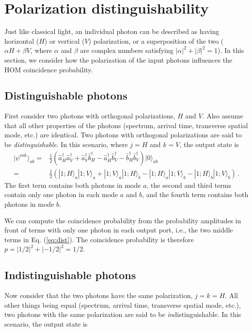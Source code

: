\documentclass[12pt]{article}
\newcommand{\ket}[2] {| #1 \rangle_{#2}}
\newcommand{\dg}{^{\dagger}}
\begin{document}
\section{Polarization distinguishability}\label{sec:pol}

Just like classical light, an individual photon can be described as having horizontal ($H$) or vertical ($V$) polarization, or a superposition of the two ($\alpha H+\beta V$, where $\alpha$ and $\beta$ are complex numbers satisfying $|\alpha|^2+|\beta|^2=1$). In this section, we consider how the polarization of the input photons influences the HOM coincidence probability. 

\subsection{Distinguishable photons}

First  consider two photons with orthogonal polarizations, $H$ and $V$. Also assume that all other properties of the  photons (spectrum, arrival time, transverse spatial mode, etc.) are identical. Two photons with orthogonal polarizations are said to be \emph{distinguishable}. In this scenario, where $j=H$ and $k=V$, the output state is
\begin{align}
\ket{\psi^{\mathrm{out}}}{ab}={}&\frac{1}{2}\left(\hat{a}\dg_{H}\hat{a}\dg_{V}+\hat{a}\dg_{V}\hat{b}\dg_{H}-\hat{a}\dg_{H}\hat{b}\dg_{V}-\hat{b}\dg_{H}\hat{b}\dg_{V}\right)\ket{0}{ab}\\\label{eq:dist}
={}&\frac{1}{2}\left(\ket{1;H}{a}\ket{1;V}{a}+\ket{1;V}{a}\ket{1;H}{b}-\ket{1;H}{a}\ket{1;V}{b}-\ket{1;H}{b}\ket{1;V}{b}\right)\,.
\end{align}
The first term contains both photons in mode $a$, the second and third terms contain only one photon in each mode $a$ and $b$, and the fourth term contains both photons in mode $b$.

We can compute the coincidence probability from the probability amplitudes in front of terms with only one photon in each output port, i.e., the two middle terms in Eq. (\ref{eq:dist}). The coincidence probability is therefore $p=|1/2|^2+|{-}1/2|^2=1/2$.

\subsection{Indistinguishable photons}

Now consider that the two photons have the same polarization,  $j=k=H$. All other things being equal (spectrum, arrival time, transverse spatial mode, etc.), two photons with the same polarization are said to be \emph{in}distinguishable. In this scenario, the output state is
\end{document}
